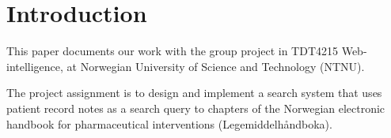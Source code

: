 \chapter{Introduction} \label{cha:Introduction}

This paper documents our work with the group project in TDT4215
Web-intelligence, at Norwegian University of Science and Technology (NTNU).

The project assignment is to design and implement a search system that uses
patient record notes as a search query to chapters of the Norwegian electronic
handbook for pharmaceutical interventions
(Legemiddelhåndboka)\cite{website:nlh}.
